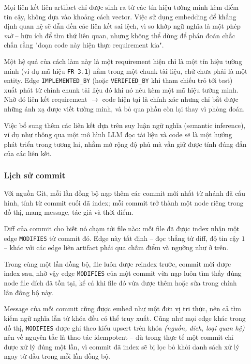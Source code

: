 Mọi liên kết liên artifact chỉ được sinh ra từ các tín hiệu tường minh kèm điểm tin cậy, không dựa vào khoảng cách vector. Việc sử dụng embedding để khẳng định quan hệ sẽ dẫn đến các liên kết sai lệch, vì so khớp ngữ nghĩa là một phép \textit{mờ} -- hữu ích để tìm thứ liên quan, nhưng không thể dùng để phán đoán chắc chắn rằng "đoạn code này hiện thực requirement kia".

Một hệ quả của cách làm này là một requirement hiện chỉ là một tín hiệu tường minh (ví dụ mã hiệu \texttt{FR-3.1}) nằm trong một chunk tài liệu, chứ chưa phải là một entity. Edge \texttt{IMPLEMENTED\_BY} (hoặc \texttt{VERIFIED\_BY} khi tham chiếu trỏ tới test) xuất phát từ chính chunk tài liệu đó khi nó nêu kèm một mã hiệu tường minh. Nhờ đó liên kết requirement $\rightarrow$ code hiện tại là chính xác nhưng chỉ bắt được những ánh xạ được viết tường minh, và bỏ qua phần còn lại thay vì phỏng đoán. 

Việc bổ sung thêm các liên kết dựa trên suy luận ngữ nghĩa (semantic inference), ví dụ như thông qua một mô hình LLM đọc tài liệu và code sẽ là một hướng phát triển trong tương lai, nhằm mở rộng độ phủ mà vẫn giữ được tính đúng đắn của các liên kết.


\subsubsection{Lịch sử commit}

Với nguồn Git, mỗi lần đồng bộ nạp thêm các commit mới nhất từ nhánh đã cấu hình, tính từ commit cuối đã index; mỗi commit trở thành một node riêng trong đồ thị, mang message, tác giả và thời điểm.

Diff của commit cho biết nó chạm tới file nào: mỗi file đã được index nhận một edge \texttt{MODIFIES} từ commit đó. Edge này tất định -- đọc thẳng từ diff, độ tin cậy $1$ -- khác với các edge liên artifact phải qua chấm điểm và ngưỡng như ở trên.

Trong cùng một lần đồng bộ, file luôn được reindex trước, commit mới được index sau, nhờ vậy edge \texttt{MODIFIES} của một commit vừa nạp luôn tìm thấy đúng node file đích đã tồn tại, kể cả khi file đó vừa được thêm hoặc sửa trong chính lần đồng bộ này.

Message của mỗi commit cũng được embed như một đơn vị tri thức, nên cả tìm kiếm ngữ nghĩa lẫn từ khóa đều có thể truy xuất. Cũng như mọi edge khác trong đồ thị, \texttt{MODIFIES} được ghi theo kiểu upsert trên khóa \textit{(nguồn, đích, loại quan hệ)} nên về nguyên tắc là thao tác idempotent -- dù trong thực tế một commit chỉ được xử lý đúng một lần, vì commit đã index sẽ bị lọc bỏ khỏi danh sách xử lý ngay từ đầu trong mỗi lần đồng bộ.

